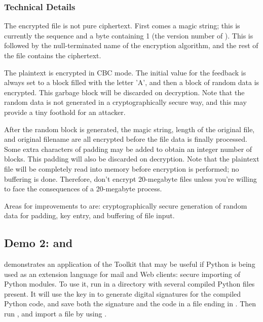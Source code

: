 \documentclass{howto}
\begin{document}
\subsubsection{Technical Details}

The encrypted file is not pure ciphertext.  First comes a magic
string; this is currently the sequence  and a byte
containing 1 (the version number of ).
This is followed by the null-terminated name of the encryption
algorithm, and the rest of the file contains the ciphertext.  

The plaintext is encrypted in CBC mode.  The initial value for the
feedback is always set to a block filled with the letter 'A', and then
a block of random data is encrypted.  This garbage block will be
discarded on decryption.  Note that the random data is not generated
in a cryptographically secure way, and this may provide a tiny foothold for
an attacker.

After the random block is generated, the magic string, length of the
original file, and original filename are all encrypted before the file
data is finally processed.  Some extra characters of padding may be
added to obtain an integer number of blocks.  This padding will also
be discarded on decryption.  Note that the plaintext file will be
completely read into memory before encryption is performed; no
buffering is done.  Therefore, don't encrypt 20-megabyte files unless
you're willing to face the consequences of a 20-megabyte process.

Areas for improvements to  are: cryptographically secure
generation of random data
for padding, key entry, and buffering of file
input.

\subsection{Demo 2:  and }

 demonstrates an application of the Toolkit that may be
useful if Python is being used as an extension language for mail and Web
clients: secure importing of Python modules.  To use it, run
 in a directory with several compiled Python files
present.  It will use the key in  to generate digital
signatures for the compiled Python code, and save both the signature and
the code in a file ending in .  Then run , and import a file by using .  
\end{document}
